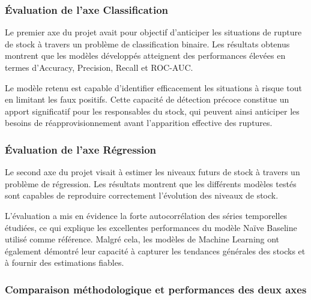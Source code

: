 \subsubsection{Évaluation de l'axe Classification}
 
Le premier axe du projet avait pour objectif d'anticiper les situations de rupture de stock à travers un problème de classification binaire. Les résultats obtenus montrent que les modèles développés atteignent des performances élevées en termes d'Accuracy, Precision, Recall et ROC-AUC.
 
Le modèle retenu est capable d'identifier efficacement les situations à risque tout en limitant les faux positifs. Cette capacité de détection précoce constitue un apport significatif pour les responsables du stock, qui peuvent ainsi anticiper les besoins de réapprovisionnement avant l'apparition effective des ruptures.
 
\subsubsection{Évaluation de l'axe Régression}
 
Le second axe du projet visait à estimer les niveaux futurs de stock à travers un problème de régression. Les résultats montrent que les différents modèles testés sont capables de reproduire correctement l'évolution des niveaux de stock.
 
L'évaluation a mis en évidence la forte autocorrélation des séries temporelles étudiées, ce qui explique les excellentes performances du modèle Naïve Baseline utilisé comme référence. Malgré cela, les modèles de Machine Learning ont également démontré leur capacité à capturer les tendances générales des stocks et à fournir des estimations fiables.
 
\subsubsection{Comparaison méthodologique et performances des deux axes}
 

